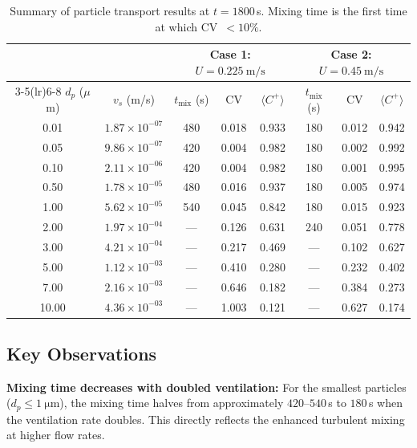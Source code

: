 \documentclass[12pt]{article}
\begin{document}
\begin{table}[H]
\centering
\caption{Summary of particle transport results at $t = 1800\,$s. Mixing time is the first time at which CV~$< 10\%$.}
\label{tab:results}
\small
\begin{tabular}{cc|ccc|ccc}
\toprule
&& \multicolumn{3}{c|}{\textbf{Case 1: $U = \SI{0.225}{\meter\per\second}$}} & \multicolumn{3}{c}{\textbf{Case 2: $U = \SI{0.45}{\meter\per\second}$}} \\
\cmidrule(lr){3-5}\cmidrule(lr){6-8}
$d_p$ ($\mu$m) & $v_s$ (m/s) & $t_\text{mix}$ (s) & CV & $\langle C^+ \rangle$ & $t_\text{mix}$ (s) & CV & $\langle C^+ \rangle$ \\
\midrule
0.01  & $1.87\times10^{-07}$ & 480 & 0.018 & 0.933 & 180 & 0.012 & 0.942 \\
0.05  & $9.86\times10^{-07}$ & 420 & 0.004 & 0.982 & 180 & 0.002 & 0.992 \\
0.10  & $2.11\times10^{-06}$ & 420 & 0.004 & 0.982 & 180 & 0.001 & 0.995 \\
0.50  & $1.78\times10^{-05}$ & 480 & 0.016 & 0.937 & 180 & 0.005 & 0.974 \\
1.00  & $5.62\times10^{-05}$ & 540 & 0.045 & 0.842 & 180 & 0.015 & 0.923 \\
2.00  & $1.97\times10^{-04}$ & --- & 0.126 & 0.631 & 240 & 0.051 & 0.778 \\
3.00  & $4.21\times10^{-04}$ & --- & 0.217 & 0.469 & --- & 0.102 & 0.627 \\
5.00  & $1.12\times10^{-03}$ & --- & 0.410 & 0.280 & --- & 0.232 & 0.402 \\
7.00  & $2.16\times10^{-03}$ & --- & 0.646 & 0.182 & --- & 0.384 & 0.273 \\
10.00 & $4.36\times10^{-03}$ & --- & 1.003 & 0.121 & --- & 0.627 & 0.174 \\
\bottomrule
\end{tabular}
\end{table}

\subsection{Key Observations}

\textbf{Mixing time decreases with doubled ventilation:} For the smallest particles ($d_p \le \SI{1}{\micro\meter}$), the mixing time halves from approximately $420$--$540\,$s to $180\,$s when the ventilation rate doubles. This directly reflects the enhanced turbulent mixing at higher flow rates.
\end{document}
